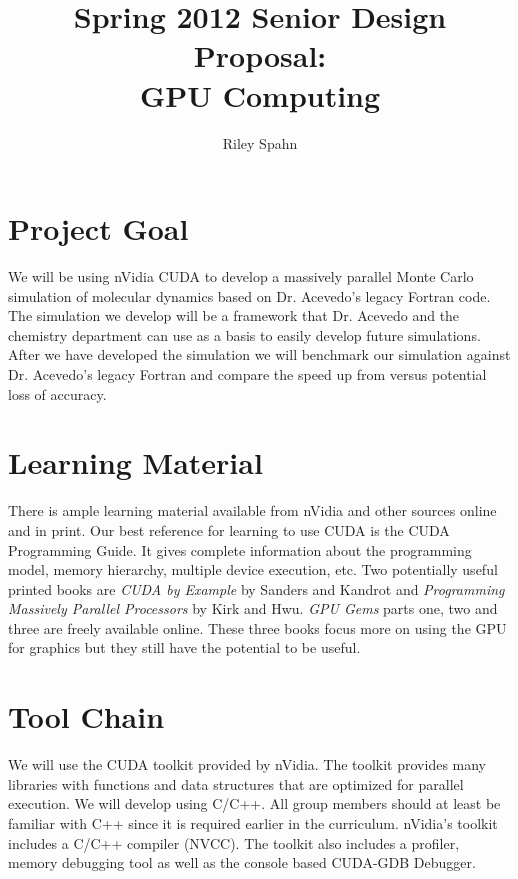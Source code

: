 \setlength{\topmargin}{-.8in}
\setlength{\textheight}{9in}
\setlength{\oddsidemargin}{.125in}
\setlength{\textwidth}{6.5in}

\title{Spring 2012 Senior Design Proposal:\\
GPU Computing}
\author{Riley Spahn}
\renewcommand{\today}{December 2011}
\maketitle

\section*{Project Goal}
We will be using nVidia CUDA to develop a massively parallel Monte Carlo 
simulation of molecular dynamics based on Dr. Acevedo's legacy Fortran code.
The simulation we develop will be a framework that Dr. Acevedo and the chemistry
department can use as a basis to easily develop future simulations.  After we
have developed the simulation we will benchmark our simulation against Dr.
Acevedo's legacy Fortran and compare the speed up from versus potential loss of
accuracy.  

\section*{Learning Material}
There is ample learning material available from nVidia and other sources online
and in print.  Our best reference for learning to use CUDA is the CUDA
Programming Guide.  It gives complete information about the programming model,
memory hierarchy, multiple device execution, etc.
Two potentially useful printed books are \emph{CUDA by Example} by Sanders and
Kandrot and \emph{Programming Massively Parallel Processors} by Kirk and Hwu.
\emph{GPU Gems} parts one, two and three are freely available online.  These
three books focus more on using the GPU for graphics but they still have the
potential to be useful.

\section*{Tool Chain}
We will use the CUDA toolkit provided by nVidia.  The toolkit provides many
libraries with functions and data structures that are optimized for parallel
execution.  We will develop using C/C++.  All group members should at least be
familiar with C++ since it is required earlier in the curriculum.  nVidia's
toolkit includes a C/C++ compiler (NVCC).  The toolkit also includes a profiler,
memory debugging tool as well as the console based CUDA-GDB Debugger.

